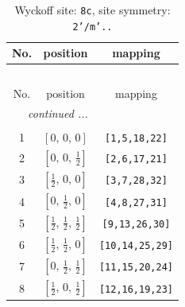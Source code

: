 \documentclass[fleqn,8pt]{jsarticle}
\begin{document}
\begin{longtable}{ccc}
\caption{Wyckoff site: {\tt 8c}, site symmetry: {\tt 2'/m'..}}
 \\
 \hline \hline
No. & position & mapping \\ \hline \endfirsthead

\multicolumn{2}{l}{\tablename\ \thetable{}} \\
 \hline \hline
No. & position & mapping \\ \hline \endhead

 \hline \hline
\multicolumn{2}{r}{\footnotesize\it continued ...} \\ \endfoot

 \hline \hline
\multicolumn{2}{r}{} \\ \endlastfoot

1 & $\left[ 0,\, 0,\, 0 \right]$ & {\tt [1,5,18,22]} \\ \hline
2 & $\left[ 0,\, 0,\, \frac{1}{2} \right]$ & {\tt [2,6,17,21]} \\ \hline
3 & $\left[ \frac{1}{2},\, 0,\, 0 \right]$ & {\tt [3,7,28,32]} \\ \hline
4 & $\left[ 0,\, \frac{1}{2},\, 0 \right]$ & {\tt [4,8,27,31]} \\ \hline
5 & $\left[ \frac{1}{2},\, \frac{1}{2},\, \frac{1}{2} \right]$ & {\tt [9,13,26,30]} \\ \hline
6 & $\left[ \frac{1}{2},\, \frac{1}{2},\, 0 \right]$ & {\tt [10,14,25,29]} \\ \hline
7 & $\left[ 0,\, \frac{1}{2},\, \frac{1}{2} \right]$ & {\tt [11,15,20,24]} \\ \hline
8 & $\left[ \frac{1}{2},\, 0,\, \frac{1}{2} \right]$ & {\tt [12,16,19,23]} \\
\end{longtable}
\renewcommand{\arraystretch}{1.2}
\end{document}

